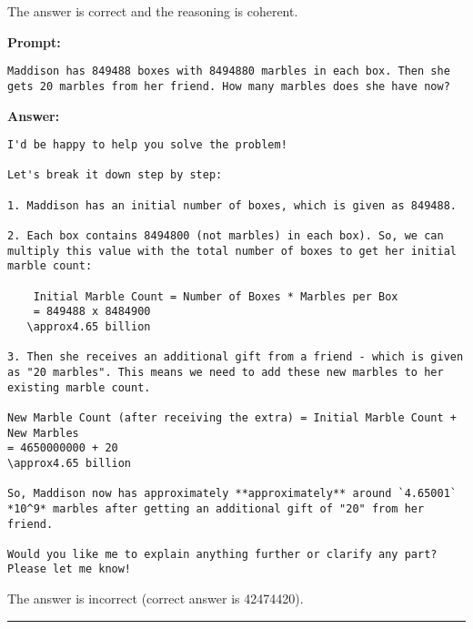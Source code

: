 The answer is correct and the reasoning is coherent.
\begin{displayquote}
	\textbf{Prompt:}
	\begin{Verbatim}[fontsize=\small,breaklines]
Maddison has 849488 boxes with 8494880 marbles in each box. Then she gets 20 marbles from her friend. How many marbles does she have now?
	\end{Verbatim}
	\textbf{Answer:}
	\begin{Verbatim}[fontsize=\small,breaklines]
I'd be happy to help you solve the problem!

Let's break it down step by step:

1. Maddison has an initial number of boxes, which is given as 849488.

2. Each box contains 8494800 (not marbles) in each box). So, we can multiply this value with the total number of boxes to get her initial marble count:

    Initial Marble Count = Number of Boxes * Marbles per Box
    = 849488 x 8484900
   \approx4.65 billion

3. Then she receives an additional gift from a friend - which is given as "20 marbles". This means we need to add these new marbles to her existing marble count.

New Marble Count (after receiving the extra) = Initial Marble Count + New Marbles
= 4650000000 + 20
\approx4.65 billion

So, Maddison now has approximately **approximately** around `4.65001` *10^9* marbles after getting an additional gift of "20" from her friend.

Would you like me to explain anything further or clarify any part? Please let me know!
	\end{Verbatim}
\end{displayquote}
The answer is incorrect (correct answer is 42474420).

\noindent\rule{\textwidth}{0.4pt}

